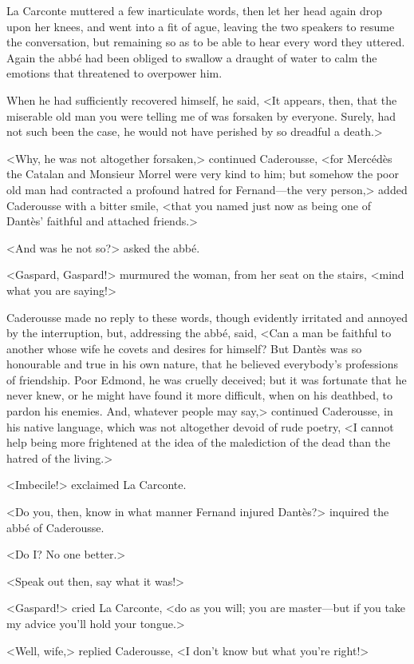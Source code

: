  La Carconte muttered a few inarticulate words, then let her head again drop upon her knees, and went into a fit of ague, leaving the two speakers to resume the conversation, but remaining so as to be able to hear every word they uttered. Again the abbé had been obliged to swallow a draught of water to calm the emotions that threatened to overpower him. 

 When he had sufficiently recovered himself, he said, <It appears, then, that the miserable old man you were telling me of was forsaken by everyone. Surely, had not such been the case, he would not have perished by so dreadful a death.> 

 <Why, he was not altogether forsaken,> continued Caderousse, <for Mercédès the Catalan and Monsieur Morrel were very kind to him; but somehow the poor old man had contracted a profound hatred for Fernand—the very person,> added Caderousse with a bitter smile, <that you named just now as being one of Dantès' faithful and attached friends.> 

 <And was he not so?> asked the abbé. 

 <Gaspard, Gaspard!> murmured the woman, from her seat on the stairs, <mind what you are saying!> 

 Caderousse made no reply to these words, though evidently irritated and annoyed by the interruption, but, addressing the abbé, said, <Can a man be faithful to another whose wife he covets and desires for himself? But Dantès was so honourable and true in his own nature, that he believed everybody's professions of friendship. Poor Edmond, he was cruelly deceived; but it was fortunate that he never knew, or he might have found it more difficult, when on his deathbed, to pardon his enemies. And, whatever people may say,> continued Caderousse, in his native language, which was not altogether devoid of rude poetry, <I cannot help being more frightened at the idea of the malediction of the dead than the hatred of the living.> 

 <Imbecile!> exclaimed La Carconte. 

 <Do you, then, know in what manner Fernand injured Dantès?> inquired the abbé of Caderousse. 

 <Do I? No one better.> 

 <Speak out then, say what it was!> 

 <Gaspard!> cried La Carconte, <do as you will; you are master—but if you take my advice you'll hold your tongue.> 

 <Well, wife,> replied Caderousse, <I don't know but what you're right!> 

